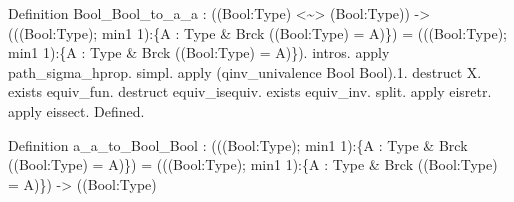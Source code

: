 \begin{coqdoccode}
\begin{coqdoccomment}
\coqdoceol
Definition\coqdocindent{0.50em}
Bool\_Bool\_to\_a\_a\coqdocindent{0.50em}
:\coqdocindent{0.50em}
\coqdoceol
\coqdocindent{1.00em}
((Bool:Type)\coqdocindent{0.50em}
<\~{}>\coqdocindent{0.50em}
(Bool:Type))\coqdocindent{0.50em}
->\coqdocindent{0.50em}
\coqdoceol
\coqdocindent{1.00em}
(((Bool:Type);\coqdocindent{0.50em}
min1\coqdocindent{0.50em}
1):\{A\coqdocindent{0.50em}
:\coqdocindent{0.50em}
Type\coqdocindent{0.50em}
\&\coqdocindent{0.50em}
Brck\coqdocindent{0.50em}
((Bool:Type)\coqdocindent{0.50em}
=\coqdocindent{0.50em}
A)\})\coqdocindent{0.50em}
\coqdoceol
\coqdocindent{1.00em}
=\coqdoceol
\coqdocindent{1.00em}
(((Bool:Type);\coqdocindent{0.50em}
min1\coqdocindent{0.50em}
1):\{A\coqdocindent{0.50em}
:\coqdocindent{0.50em}
Type\coqdocindent{0.50em}
\&\coqdocindent{0.50em}
Brck\coqdocindent{0.50em}
((Bool:Type)\coqdocindent{0.50em}
=\coqdocindent{0.50em}
A)\}).\coqdoceol
\coqdocindent{1.00em}
intros.\coqdoceol
\coqdocindent{1.00em}
apply\coqdocindent{0.50em}
path\_sigma\_hprop.\coqdocindent{0.50em}
simpl.\coqdoceol
\coqdocindent{1.00em}
apply\coqdocindent{0.50em}
(qinv\_univalence\coqdocindent{0.50em}
Bool\coqdocindent{0.50em}
Bool).1.\coqdoceol
\coqdocindent{1.00em}
destruct\coqdocindent{0.50em}
X.\coqdocindent{0.50em}
exists\coqdocindent{0.50em}
equiv\_fun.\coqdoceol
\coqdocindent{1.00em}
destruct\coqdocindent{0.50em}
equiv\_isequiv.\coqdocindent{0.50em}
exists\coqdocindent{0.50em}
equiv\_inv.\coqdoceol
\coqdocindent{1.00em}
split.\coqdocindent{0.50em}
apply\coqdocindent{0.50em}
eisretr.\coqdocindent{0.50em}
apply\coqdocindent{0.50em}
eissect.\coqdoceol
Defined.\coqdoceol
\end{coqdoccomment}
\coqdoceol
\coqdocemptyline
\coqdocnoindent
\begin{coqdoccomment}
\coqdoceol
Definition\coqdocindent{0.50em}
a\_a\_to\_Bool\_Bool\coqdocindent{0.50em}
:\coqdocindent{0.50em}
\coqdoceol
\coqdocindent{1.00em}
(((Bool:Type);\coqdocindent{0.50em}
min1\coqdocindent{0.50em}
1):\{A\coqdocindent{0.50em}
:\coqdocindent{0.50em}
Type\coqdocindent{0.50em}
\&\coqdocindent{0.50em}
Brck\coqdocindent{0.50em}
((Bool:Type)\coqdocindent{0.50em}
=\coqdocindent{0.50em}
A)\})\coqdocindent{0.50em}
\coqdoceol
\coqdocindent{1.00em}
=\coqdoceol
\coqdocindent{1.00em}
(((Bool:Type);\coqdocindent{0.50em}
min1\coqdocindent{0.50em}
1):\{A\coqdocindent{0.50em}
:\coqdocindent{0.50em}
Type\coqdocindent{0.50em}
\&\coqdocindent{0.50em}
Brck\coqdocindent{0.50em}
((Bool:Type)\coqdocindent{0.50em}
=\coqdocindent{0.50em}
A)\})\coqdocindent{0.50em}
\coqdoceol
\coqdocindent{1.00em}
->\coqdocindent{0.50em}
((Bool:Type)\coqdocindent{0.50em}

\end{coqdoccomment}
\end{coqdoccode}
